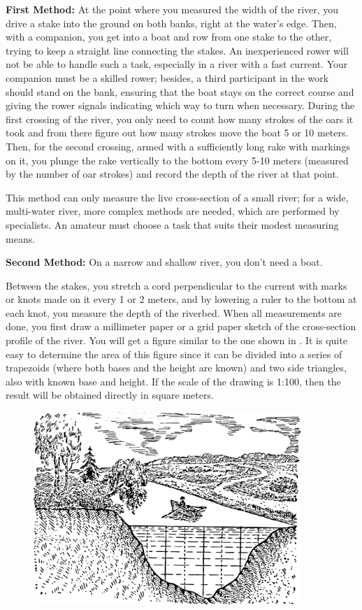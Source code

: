 \textbf{First Method:} At the point where you measured the width of the river, you drive a stake into the ground on both banks, right at the water's edge. Then, with a companion, you get into a boat and row from one stake to the other, trying to keep a straight line connecting the stakes. An inexperienced rower will not be able to handle such a task, especially in a river with a fast current. Your companion must be a skilled rower; besides, a third participant in the work should stand on the bank, ensuring that the boat stays on the correct course and giving the rower signals indicating which way to turn when necessary. During the first crossing of the river, you only need to count how many strokes of the oars it took and from there figure out how many strokes move the boat 5 or 10 meters. Then, for the second crossing, armed with a sufficiently long rake with markings on it, you plunge the rake vertically to the bottom every 5-10 meters (measured by the number of oar strokes) and record the depth of the river at that point.

This method can only measure the live cross-section of a small river; for a wide, multi-water river, more complex methods are needed, which are performed by specialists. An amateur must choose a task that suits their modest measuring means.

\textbf{Second Method:} On a narrow and shallow river, you don't need a boat.

Between the stakes, you stretch a cord perpendicular to the current with marks or knots made on it every 1 or 2 meters, and by lowering a ruler to the bottom at each knot, you measure the depth of the riverbed. When all measurements are done, you first draw a millimeter paper or a grid paper sketch of the cross-section profile of the river. You will get a figure similar to the one shown in . It is quite easy to determine the area of this figure since it can be divided into a series of trapezoids (where both bases and the height are known) and two side triangles, also with known base and height. If the scale of the drawing is 1:100, then the result will be obtained directly in square meters.

\begin{figure}[h!]
\centering
\includegraphics[width=0.9\textwidth]{figures/ch-02/fig-042.pdf}
\end{figure}

